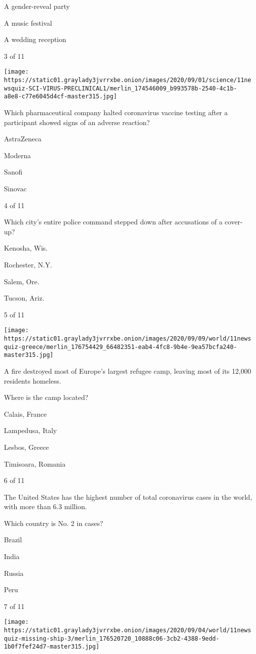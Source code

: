 A gender-reveal party

A music festival

A wedding reception

3 of 11

\texttt{[image: https://static01.graylady3jvrrxbe.onion/images/2020/09/01/science/11newsquiz-SCI-VIRUS-PRECLINICAL1/merlin\_174546009\_b993578b-2540-4c1b-a8e8-c77e6045d4cf-master315.jpg]}

Which pharmaceutical company halted coronavirus vaccine testing after a
participant showed signs of an adverse reaction?

AstraZeneca

Moderna

Sanofi

Sinovac

4 of 11

Which city's entire police command stepped down after accusations of a
cover-up?

Kenosha, Wis.

Rochester, N.Y.

Salem, Ore.

Tucson, Ariz.

5 of 11

\texttt{[image: https://static01.graylady3jvrrxbe.onion/images/2020/09/09/world/11newsquiz-greece/merlin\_176754429\_66482351-eab4-4fc8-9b4e-9ea57bcfa240-master315.jpg]}

A fire destroyed most of Europe's largest refugee camp, leaving most of
its 12,000 residents homeless.

Where is the camp located?

Calais, France

Lampedusa, Italy

Lesbos, Greece

Timisoara, Romania

6 of 11

The United States has the highest number of total coronavirus cases in
the world, with more than 6.3 million.

Which country is No. 2 in cases?

Brazil

India

Russia

Peru

7 of 11

\texttt{[image: https://static01.graylady3jvrrxbe.onion/images/2020/09/04/world/11newsquiz-missing-ship-3/merlin\_176520720\_10888c06-3cb2-4388-9edd-1b0f7fef24d7-master315.jpg]}

